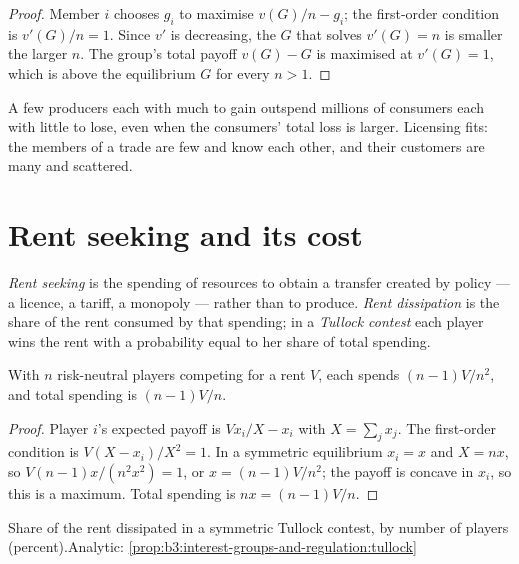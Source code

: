 \begin{proof}
Member $i$ chooses $g_i$ to maximise $v(G)/n - g_i$; the first-order condition is $v'(G)/n = 1$. Since
$v'$ is decreasing, the $G$ that solves $v'(G) = n$ is smaller the larger $n$. The group's total
payoff $v(G) - G$ is maximised at $v'(G) = 1$, which is above the equilibrium $G$ for every
$n > 1$.
\end{proof}

A few producers each with much to gain outspend millions of consumers each with
little to lose, even when the consumers' total loss is larger. Licensing fits: the
members of a trade are few and know each other, and their customers are many and
scattered.

\section{Rent seeking and its cost}\label{sec:b3:interest-groups-and-regulation:rent-seeking}

\begin{definition}\label{def:b3:interest-groups-and-regulation:rent-seeking}
\emph{Rent seeking} is the spending of resources to obtain a transfer created by
policy --- a licence, a tariff, a monopoly --- rather than to produce. \emph{Rent
dissipation} is the share of the rent consumed by that spending; in a \emph{Tullock
contest} each player wins the rent with a probability equal to her share of total
spending.
\end{definition}

\begin{proposition}\label{prop:b3:interest-groups-and-regulation:tullock}
With $n$ risk-neutral players competing for a rent $V$, each spends $(n - 1)V/n^2$, and total
spending is $(n - 1)V/n$.
\end{proposition}

\begin{proof}
Player $i$'s expected payoff is $Vx_i/X - x_i$ with $X = \sum_j x_j$. The first-order condition is
$V(X - x_i)/X^2 = 1$. In a symmetric equilibrium $x_i = x$ and $X = nx$, so $V(n - 1)x/(n^2x^2) = 1$, or $x = (n - 1)V/n^2$; the
payoff is concave in $x_i$, so this is a maximum. Total spending is $nx = (n - 1)V/n$.
\end{proof}

\begin{omchart}{Share of the rent dissipated in a symmetric Tullock contest, by number
of players (percent).}{Analytic: \cref{prop:b3:interest-groups-and-regulation:tullock}}
\end{omchart}

